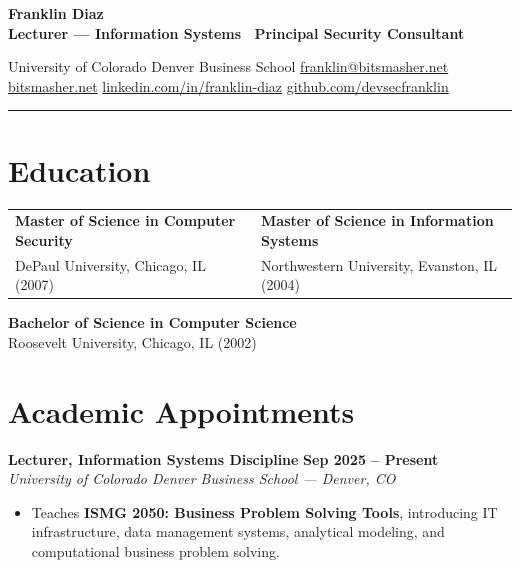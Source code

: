 \documentclass[10pt, a4paper]{article}
\begin{document}
\color{textdark}

{\fontsize{20pt}{22pt}\selectfont\textbf{\color{primary}Franklin Diaz}}\\[3pt]
{\fontsize{10pt}{12pt}\selectfont\textbf{\color{accent}Lecturer --- Information Systems \textbar\ Principal Security Consultant}}\\[5pt]
\begin{minipage}[t]{\linewidth}
\raggedleft
{\fontsize{8.5pt}{10pt}\selectfont\color{muted}
University of Colorado Denver Business School \enspace\textbullet\enspace
\href{mailto:franklin@bitsmasher.net}{franklin@bitsmasher.net} \enspace\textbullet\enspace
\href{https://www.bitsmasher.net/research/}{bitsmasher.net} \enspace\textbullet\enspace
\href{https://linkedin.com/in/franklin-diaz}{linkedin.com/in/franklin-diaz} \enspace\textbullet\enspace
\href{https://github.com/devsecfranklin}{github.com/devsecfranklin}}
\end{minipage}
\par\vspace{6pt}\par
{\color{primary}\rule{\linewidth}{1.8pt}}\par

\section{Education}
\noindent
\begin{tabularx}{\textwidth}{@{}X X@{}}
\textbf{Master of Science in Computer Security} & \textbf{Master of Science in Information Systems} \\
DePaul University, Chicago, IL (2007) & Northwestern University, Evanston, IL (2004)
\end{tabularx}
\vspace{4pt}

\noindent
\textbf{Bachelor of Science in Computer Science} \\
Roosevelt University, Chicago, IL (2002)

\section{Academic Appointments}
\noindent\textbf{Lecturer, Information Systems Discipline} \hfill {\color{muted}\textbf{Sep 2025 -- Present}} \\
{\color{textdark}\textit{University of Colorado Denver Business School --- Denver, CO}}
\begin{itemize}
    \item Teaches \textbf{ISMG 2050: Business Problem Solving Tools}, introducing IT infrastructure, data management systems, analytical modeling, and computational business problem solving.
\end{itemize}
\end{document}
